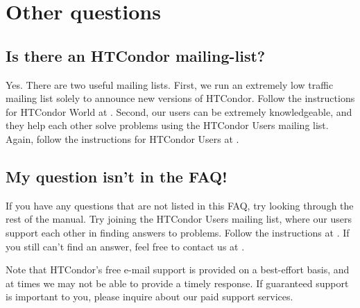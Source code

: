 \section{Other questions}


\subsection*{Is there an HTCondor mailing-list?}

Yes. There are two useful mailing lists.
First, we run an extremely low traffic mailing list solely to announce new
versions of HTCondor.
Follow the instructions for HTCondor World at
.
Second, our users can be extremely knowledgeable,
and they help each other solve problems
using the HTCondor Users mailing list.
Again, follow the instructions for HTCondor Users at
.



\subsection*{My question isn't in the FAQ!}

If you have any questions that are not listed in this FAQ, try looking
through the rest of the manual.
Try joining the HTCondor Users mailing list, where our users
support each other in finding answers to problems.
Follow the instructions at
.
If you still can't find an answer, feel free to contact us at
.

Note that HTCondor's free e-mail support is provided on a best-effort
basis, and at times we may not be able to provide a timely response.
If guaranteed support is important to you, please inquire about our
paid support services.



